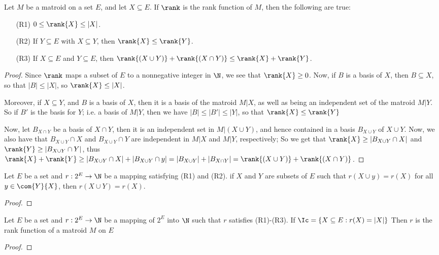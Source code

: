 \begin{lemma}\label{1.3.1}
    Let $M$ be a matroid on a set  $E$, and let $X \subseteq E$. If $\rank$ is
    the rank function of  $M$, then the following are true:
    \begin{enumerate}
        \item[(R1)] $0 \leq \rank{X} \leq |X|$.

        \item[(R2)] If  $Y \subseteq E$ with  $X \subseteq Y$, then  $\rank{X}
            \leq \rank{Y}$.

        \item[(R3)] If $X \subseteq E$ and  $Y \subseteq E$, then $\rank{(X \cup
            Y)}+\rank{(X \cap Y)} \leq \rank{X}+\rank{Y}$.
    \end{enumerate}
\end{lemma}
\begin{proof}
    Since $\rank$ maps a subset of $E$ to a nonnegative integer in $\N$, we see
    that  $\rank{X} \geq 0$. Now, if $B$ is a basis of $X$, then  $B \subseteq
    X$, so that  $|B| \leq |X|$, so  $\rank{X} \leq |X|$.

    Moreover, if $X \subseteq Y$, and  $B$ is a basis
    of  $X$, then it is a basis of the matroid  $M|X$, as well as being an
    independent set of the matroid $M|Y$. So if  $B'$ is the basis for  $Y$;
    i.e. a basis of  $M|Y$, then we have  $|B| \leq |B'| \leq |Y|$, so that
    $\rank{X} \leq \rank{Y}$

    Now, let $B_{X \cap Y}$ be a basis of $X \cap Y$, then it is an independent
    set in  $M|(X \cup Y)$, and hence contained in a basis $B_{X \cup Y}$ of $X
    \cup Y$. Now, we also have that  $B_{X \cup Y} \cap X$ and $B_{X \cup Y}
    \cap Y$ are independent in  $M|X$ and  $M|Y$, respectively; So we get that
    $\rank{X} \geq |B_{X \cup Y} \cap X|$ and $\rank{Y} \geq |B_{X \cup Y} \cap
    Y|$, thus $\rank{X}+\rank{Y} \geq |B_{X \cup Y} \cap X|+|B_{X \cup Y} \cap
    y|=|B_{X \cup Y}|+|B_{X \cap Y}|=\rank{(X \cup Y)}+\rank{(X \cap Y)}$.
\end{proof}

\begin{lemma}\label{1.3.2}
    Let $E$ be a set and  $r:2^E \rightarrow \N$ be a mapping satisfying (R1)
    and (R2). if $X$ and  $Y$ are subsets of  $E$ such that  $r(X \cup y)=r(X)$
    for all $y \in \com{Y}{X}$, then $r(X \cup Y)=r(X)$.
\end{lemma}
\begin{proof}
\end{proof}

\begin{theorem}\label{1.3.3}
    Let $E$ be a set and $r:2^E \rightarrow \N$ be a mapping of $2^E$ into
    $\N$ such that $r$ satisfies (R1)-(R3). If $\Ic=\{X \subseteq E :
    r(X)=|X|\}$ Then $r$ is the rank function of a matroid $M$ on $E$
\end{theorem}
\begin{proof}
\end{proof}
